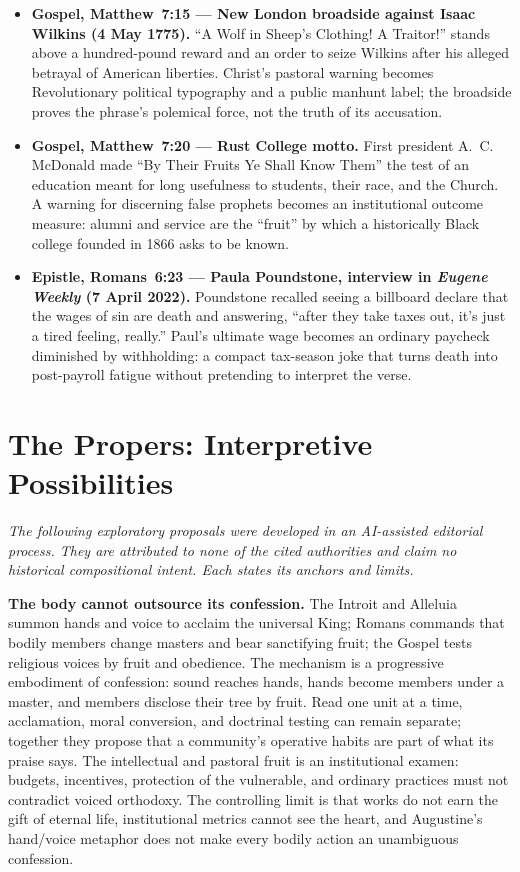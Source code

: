 {\small
\begin{itemize}[itemsep=0.35em,topsep=0.2em,parsep=0pt]
\item \textbf{Gospel, Matthew~7:15 --- New London broadside against Isaac Wilkins (4 May 1775).} ``A Wolf in Sheep's Clothing! A Traitor!'' stands above a hundred-pound reward and an order to seize Wilkins after his alleged betrayal of American liberties. Christ's pastoral warning becomes Revolutionary political typography and a public manhunt label; the broadside proves the phrase's polemical force, not the truth of its accusation.

\item \textbf{Gospel, Matthew~7:20 --- Rust College motto.} First president A.~C. McDonald made ``By Their Fruits Ye Shall Know Them'' the test of an education meant for long usefulness to students, their race, and the Church. A warning for discerning false prophets becomes an institutional outcome measure: alumni and service are the ``fruit'' by which a historically Black college founded in 1866 asks to be known.

\item \textbf{Epistle, Romans~6:23 --- Paula Poundstone, interview in \emph{Eugene Weekly} (7 April 2022).} Poundstone recalled seeing a billboard declare that the wages of sin are death and answering, ``after they take taxes out, it's just a tired feeling, really.'' Paul's ultimate wage becomes an ordinary paycheck diminished by withholding: a compact tax-season joke that turns death into post-payroll fatigue without pretending to interpret the verse.
\end{itemize}
}

\sectionguard
\section*{The Propers: Interpretive Possibilities}

\noindent\emph{The following exploratory proposals were developed in an AI-assisted editorial process. They are attributed to none of the cited authorities and claim no historical compositional intent. Each states its anchors and limits.}

\noindent\textbf{The body cannot outsource its confession.\enspace{}}
The Introit and Alleluia summon hands and voice to acclaim the universal King; Romans commands that bodily members change masters and bear sanctifying fruit; the Gospel tests religious voices by fruit and obedience. The mechanism is a progressive embodiment of confession: sound reaches hands, hands become members under a master, and members disclose their tree by fruit. Read one unit at a time, acclamation, moral conversion, and doctrinal testing can remain separate; together they propose that a community's operative habits are part of what its praise says. The intellectual and pastoral fruit is an institutional examen: budgets, incentives, protection of the vulnerable, and ordinary practices must not contradict voiced orthodoxy. The controlling limit is that works do not earn the gift of eternal life, institutional metrics cannot see the heart, and Augustine's hand/voice metaphor does not make every bodily action an unambiguous confession.

